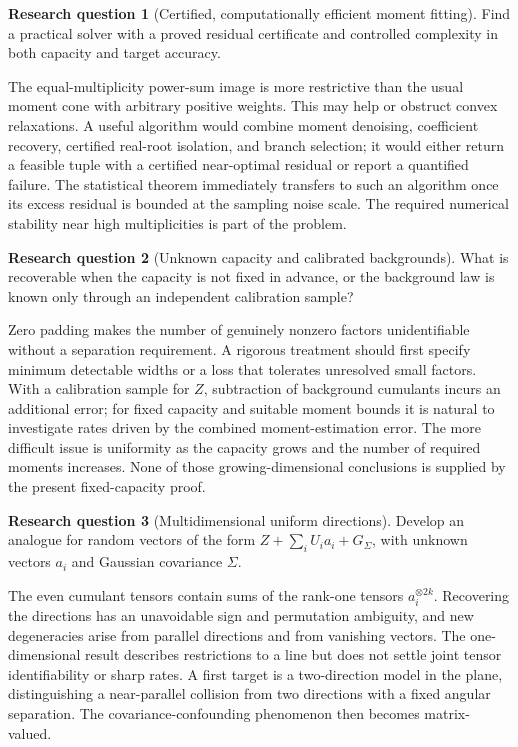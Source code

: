 \documentclass[11pt,a4paper]{article}
\numberwithin{equation}{section}
\theoremstyle{definition}
\newtheorem{question}{Research question}
\theoremstyle{remark}
\begin{document}
\begin{question}[Certified, computationally efficient moment fitting]
Find a practical solver with a proved residual certificate and controlled
complexity in both capacity and target accuracy.
\end{question}
The equal-multiplicity power-sum image is more restrictive than the usual
moment cone with arbitrary positive weights. This may help or obstruct
convex relaxations. A useful algorithm would combine moment denoising,
coefficient recovery, certified real-root isolation, and branch selection;
it would either return a feasible tuple with a certified near-optimal residual
or report a quantified failure. The statistical theorem immediately transfers
to such an algorithm once its excess residual is bounded at the sampling
noise scale. The required numerical stability near high multiplicities is
part of the problem.

\begin{question}[Unknown capacity and calibrated backgrounds]
What is recoverable when the capacity is not fixed in advance, or the background
law is known only through an independent calibration sample?
\end{question}
Zero padding makes the number of genuinely nonzero factors unidentifiable
without a separation requirement. A rigorous treatment should first specify
minimum detectable widths or a loss that tolerates unresolved small factors.
With a calibration sample for $Z$, subtraction of background cumulants incurs
an additional error; for fixed capacity and suitable moment bounds it is
natural to investigate rates driven by the combined moment-estimation error.
The more difficult issue is uniformity as the capacity grows and the number
of required moments increases. None of those growing-dimensional conclusions
is supplied by the present fixed-capacity proof.

\begin{question}[Multidimensional uniform directions]
Develop an analogue for random vectors of the form
$Z+\sum_i U_i a_i+G_\Sigma$, with unknown vectors $a_i$ and Gaussian covariance
$\Sigma$.
\end{question}
The even cumulant tensors contain sums of the rank-one tensors
$a_i^{\otimes 2k}$. Recovering the directions has an unavoidable sign and
permutation ambiguity, and new degeneracies arise from parallel directions
and from vanishing vectors. The one-dimensional result describes restrictions
to a line but does not settle joint tensor identifiability or sharp rates.
A first target is a two-direction model in the plane, distinguishing a
near-parallel collision from two directions with a fixed angular separation.
The covariance-confounding phenomenon then becomes matrix-valued.
\end{document}
